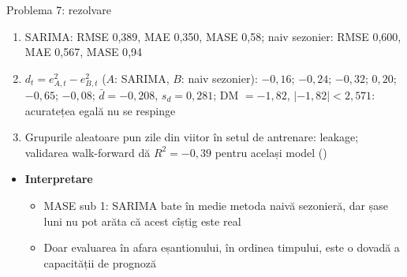 \begin{frame}{Problema 7: rezolvare}
\itemsize{\footnotesize}
\begin{enumerate}
    \item SARIMA: RMSE 0{,}389, MAE 0{,}350, MASE 0{,}58; naiv sezonier: RMSE 0{,}600, MAE 0{,}567, MASE 0{,}94
    \item $d_t = e_{A,t}^2 - e_{B,t}^2$ ($A$: SARIMA, $B$: naiv sezonier): $\ensuremath{-}0{,}16$; $\ensuremath{-}0{,}24$; $\ensuremath{-}0{,}32$; $0{,}20$; $\ensuremath{-}0{,}65$; $\ensuremath{-}0{,}08$; $\bar d = \ensuremath{-}0{,}208$, $s_d = 0{,}281$; DM $= \ensuremath{-}1{,}82$, $|\ensuremath{-}1{,}82| < 2{,}571$: acuratețea egală nu se respinge
    \item Grupurile aleatoare pun zile din viitor în setul de antrenare: leakage; validarea walk-forward dă $R^2 = \ensuremath{-}0{,}39$ pentru același model ()
\end{enumerate}
\begin{itemize}
    \item \textbf{Interpretare}
    \begin{itemize}
        \item MASE sub 1: SARIMA bate în medie metoda naivă sezonieră, dar șase luni nu pot arăta că acest cîștig este real
        \item Doar evaluarea în afara eșantionului, în ordinea timpului, este o dovadă a capacității de prognoză
    \end{itemize}
\end{itemize}
\end{frame}


